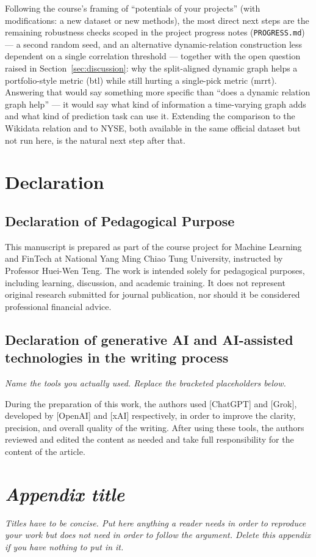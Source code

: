 \documentclass[12pt]{article}
\newcommand{\inst}[1]{\textit{#1}}
\begin{document}
Following the course's framing of ``potentials of your projects'' (with modifications: a new
dataset or new methods), the most direct next steps are the remaining robustness checks scoped in
the project progress notes (\texttt{PROGRESS.md}) --- a second random seed, and an alternative
dynamic-relation construction less dependent on a single correlation threshold --- together with
the open question raised in Section~\ref{sec:discussion}: why the split-aligned dynamic graph
helps a portfolio-style metric (btl) while still hurting a single-pick metric (mrrt). Answering
that would say something more specific than ``does a dynamic relation graph help'' --- it would
say what kind of information a time-varying graph adds and what kind of prediction task can use
it. Extending the comparison to the Wikidata relation and to NYSE, both available in the same
official dataset but not run here, is the natural next step after that.


\section*{Declaration}

\subsection*{Declaration of Pedagogical Purpose}

This manuscript is prepared as part of the course project for Machine Learning and
FinTech at National Yang Ming Chiao Tung University, instructed by Professor
Huei-Wen Teng. The work is intended solely for pedagogical purposes, including
learning, discussion, and academic training. It does not represent original research
submitted for journal publication, nor should it be considered professional financial
advice.

\subsection*{Declaration of generative AI and AI-assisted technologies in the writing process}

\inst{Name the tools you actually used. Replace the bracketed placeholders below.}

During the preparation of this work, the authors used [ChatGPT] and [Grok], developed
by [OpenAI] and [xAI] respectively, in order to improve the clarity, precision, and
overall quality of the writing. After using these tools, the authors reviewed and
edited the content as needed and take full responsibility for the content of the
article.






\appendix

\section{\inst{Appendix title}}

\inst{Titles have to be concise. Put here anything a reader needs in order to
reproduce your work but does not need in order to follow the argument. Delete this
appendix if you have nothing to put in it.}
\end{document}

